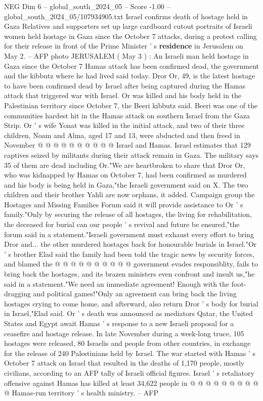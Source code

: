 \begin{textsample}{NEG Dim 6 – global\_south\_2024\_05 – Score -1.00 – global\_south\_2024\_05/107934905.txt}  \label{ex:f6_neg_237}
Israel confirms death of hostage held in Gaza Relatives and supporters set up large cardboard cutout portraits of Israeli women held hostage in Gaza since the October 7 attacks, during a protest calling for their release in front of the Prime Minister ' s \textbf{residence} in Jerusalem on May 2. -- AFP photo JERUSALEM ( May 3 ) : An Israeli man held hostage in Gaza since the October 7 Hamas attack has been confirmed dead, the government and the kibbutz where he had lived said today.
Dror Or, 49, is the latest hostage to have been confirmed dead by Israel after being captured during the Hamas attack that triggered war with Israel.
Or was killed and his body held in the Palestinian territory since October 7, the Beeri kibbutz said.
Beeri was one of the communities hardest hit in the Hamas attack on southern Israel from the Gaza Strip.
Or ' s wife Yonat was killed in the initial attack, and two of their three children, Noam and Alma, aged 17 and 13, were abducted and then freed in November @ @ @ @ @ @ @ @ @ @ Israel and Hamas.
Israel estimates that 129 captives seized by militants during their attack remain in Gaza.
The military says 35 of them are dead including Or."We are heartbroken to share that Dror Or, who was kidnapped by Hamas on October 7, had been confirmed as murdered and his body is being held in Gaza,"the Israeli government said on X.
The two children and their brother Yahli are now orphans, it added.
Campaign group the Hostages and Missing Families Forum said it will provide assistance to Or ' s family."Only by securing the release of all hostages, the living for rehabilitation, the deceased for burial can our people ' s revival and future be ensured,"the forum said in a statement."Israeli government must exhaust every effort to bring Dror and... the other murdered hostages back for honourable burials in Israel."Or ' s brother Elad said the family had been told the tragic news by security forces, and blamed the @ @ @ @ @ @ @ @ @ @ government evades responsiblity, fails to bring back the hostages, and its brazen ministers even confront and insult us,"he said in a statement."We need an immediate agreement!
Enough with the foot-dragging and political games!"Only an agreement can bring back the living hostages crying to come home, and afterward, also return Dror ' s body for burial in Israel,"Elad said.
Or ' s death was announced as mediators Qatar, the United States and Egypt await Hamas ' s response to a new Israeli proposal for a ceasefire and hostage release.
In late November during a week-long truce, 105 hostages were released, 80 Israelis and people from other countries, in exchange for the release of 240 Palestinians held by Israel.
The war started with Hamas ' s October 7 attack on Israel that resulted in the deaths of 1,170 people, mostly civilians, according to an AFP tally of Israeli official figures.
Israel ' s retaliatory offensive against Hamas has killed at least 34,622 people in @ @ @ @ @ @ @ @ @ @ Hamas-run territory ' s health ministry. -- AFP

\end{textsample}
